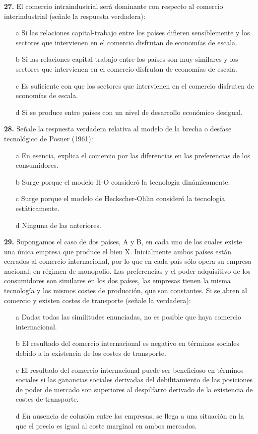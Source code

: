 \documentclass{nuevotema}
\begin{document}

\textbf{27.} El comercio intraindustrial será dominante con respecto al comercio interindustrial (señale la respuesta verdadera):
\begin{itemize}
	\item[a] Si las relaciones capital-trabajo entre los países difieren sensiblemente y los sectores que intervienen en el comercio disfrutan de economías de escala.
	\item[b] Si las relaciones capital-trabajo entre los países son muy similares y los sectores que intervienen en el comercio disfrutan de economías de escala.
	\item[c] Es suficiente con que los sectores que intervienen en el comercio disfruten de economías de escala.
	\item[d] Si se produce entre países con un nivel de desarrollo económico desigual.
\end{itemize}

\textbf{28.} Señale la respuesta verdadera relativa al modelo de la brecha o desfase tecnológico de Posner (1961):

\begin{enumerate}
	\item[a] En esencia, explica el comercio por las diferencias en las preferencias de los consumidores.
	\item[b] Surge porque el modelo H-O consideró la tecnología dinámicamente.
	\item[c] Surge porque el modelo de Heckscher-Ohlin consideró la tecnología estáticamente.
	\item[d] Ninguna de las anteriores.
\end{enumerate}

\textbf{29.} Supongamos el caso de dos países, A y B, en cada uno de los cuales existe una única empresa que produce el bien X. Inicialmente ambos países están cerrados al comercio internacional, por lo que en cada país sólo opera su empresa nacional, en régimen de monopolio. Las preferencias y el poder adquisitivo de los consumidores son similares en los dos países, las empresas tienen la misma tecnología y los mismos costes de producción, que son constantes. Si se abren al comercio y existen costes de transporte (señale la verdadera):
\begin{itemize}
	\item[a] Dadas todas las similitudes enunciadas, no es posible que haya comercio internacional.
	\item[b] El resultado del comercio internacional es negativo en términos sociales debido a la existencia de los costes de transporte.
	\item[c] El resultado del comercio internacional puede ser beneficioso en términos sociales si las ganancias sociales derivadas del debilitamiento de las posiciones de poder de mercado son superiores al despilfarro derivado de la existencia de costes de transporte.
	\item[d] En ausencia de colusión entre las empresas, se llega a una situación en la que el precio es igual al coste marginal en ambos mercados.
\end{itemize}
\end{document}
